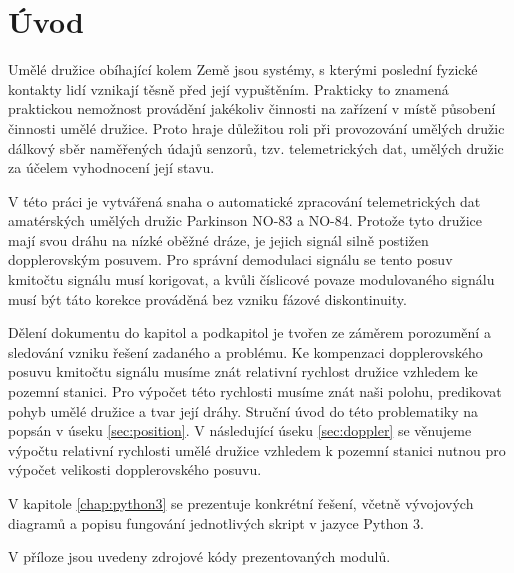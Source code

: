\chapter*{Úvod}
{}

Umělé družice obíhající kolem Země jsou systémy, s kterými poslední fyzické kontakty lidí vznikají těsně před její vypuštěním. Prakticky to znamená praktickou nemožnost provádění jakékoliv činnosti na zařízení v místě působení činnosti umělé družice. Proto hraje důležitou roli při provozování umělých družic  dálkový sběr naměřených údajů senzorů, tzv. telemetrických dat, umělých družic za účelem vyhodnocení její stavu.

V této práci je vytvářená snaha o automatické zpracování telemetrických dat amatérských umělých družic Parkinson NO-83 a NO-84. Protože tyto družice mají svou dráhu na nízké oběžné dráze, je jejich signál silně postižen dopplerovským posuvem. Pro správní demodulaci signálu se tento posuv kmitočtu signálu musí korigovat, a kvůli číslicové povaze modulovaného signálu musí být táto korekce prováděná bez vzniku fázové diskontinuity.

Dělení dokumentu do kapitol a podkapitol je tvořen ze záměrem porozumění a sledování vzniku řešení zadaného a problému. Ke kompenzaci dopplerovského posuvu kmitočtu signálu musíme znát relativní rychlost družice vzhledem ke pozemní stanici. Pro výpočet této rychlosti musíme znát naši polohu, predikovat pohyb umělé družice a tvar její dráhy. Struční úvod do této problematiky na popsán v úseku \ref{sec:position}. V následující úseku \ref{sec:doppler} se věnujeme výpočtu relativní rychlosti umělé družice vzhledem k pozemní stanici nutnou pro výpočet velikosti dopplerovského posuvu.

V kapitole \ref{chap:python3} se prezentuje konkrétní řešení, včetně vývojových diagramů a popisu fungování jednotlivých skript v jazyce Python 3.

V příloze jsou uvedeny zdrojové kódy prezentovaných modulů.
